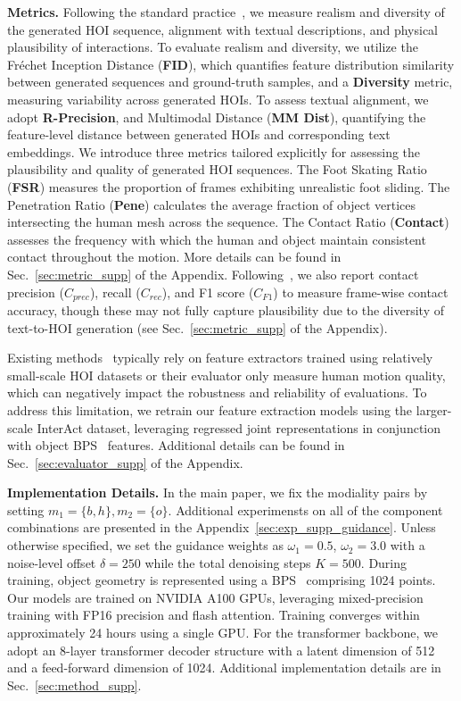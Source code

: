 \noindent \textbf{Metrics.}
Following the standard practice~\citep{guo2022generating}, we measure realism and diversity of the generated HOI sequence, alignment with textual descriptions, and physical plausibility of interactions. To evaluate realism and diversity, we utilize the Fréchet Inception Distance (\textbf{FID}), which quantifies feature distribution similarity between generated sequences and ground-truth samples, and a \textbf{Diversity} metric, measuring variability across generated HOIs. To assess textual alignment, we adopt \textbf{R-Precision}, and Multimodal Distance (\textbf{MM Dist}), quantifying the feature-level distance between generated HOIs and corresponding text embeddings.
We introduce three metrics tailored explicitly for assessing the plausibility and quality of generated HOI sequences. The Foot Skating Ratio (\textbf{FSR}) measures the proportion of frames exhibiting unrealistic foot sliding. The Penetration Ratio (\textbf{Pene}) calculates the average fraction of object vertices intersecting the human mesh across the sequence. The Contact Ratio (\textbf{Contact}) assesses the frequency with which the human and object maintain consistent contact throughout the motion. More details can be found in Sec.~\ref{sec:metric_supp} of the Appendix. Following~\citet{li2023object}, we also report contact precision ($C_{prec}$), recall ($C_{rec}$), and F1 score ($C_{F1}$) to measure frame-wise contact accuracy, though these may not fully capture plausibility due to the diversity of text-to-HOI generation (see Sec.~\ref{sec:metric_supp} of the Appendix).

Existing methods~\citep{peng2023hoi,diller2023cg,wu2024thor,song2024hoianimator} typically rely on feature extractors trained using relatively small-scale HOI datasets or their evaluator only measure human motion quality, which can negatively impact the robustness and reliability of evaluations. To address this limitation, we retrain our feature extraction models using the larger-scale InterAct dataset, leveraging regressed joint representations in conjunction with object BPS~\citep{prokudin2019efficient} features. Additional details can be found in Sec.~\ref{sec:evaluator_supp} of the Appendix.

\noindent\textbf{Implementation Details.}
In the main paper, we fix the modiality pairs by setting $m_1 = \{b, h\}, m_2 = \{o\}$. Additional experimensts on all of the component combinations are presented in the Appendix~\ref{sec:exp_supp_guidance}. Unless otherwise specified, we set the guidance weights as $\omega_{1} = 0.5$, $\omega_2 = 3.0$ with a noise-level offset $\delta = 250$ while the total denoising steps $K = 500$. During training, object geometry is represented using a BPS~\citep{prokudin2019efficient} comprising 1024 points. Our models are trained on NVIDIA A100 GPUs, leveraging mixed-precision training with FP16 precision and flash attention. Training converges within approximately 24 hours using a single GPU. For the transformer backbone, we adopt an 8-layer transformer decoder structure with a latent dimension of 512 and a feed-forward dimension of 1024. Additional implementation details are in Sec.~\ref{sec:method_supp}.

